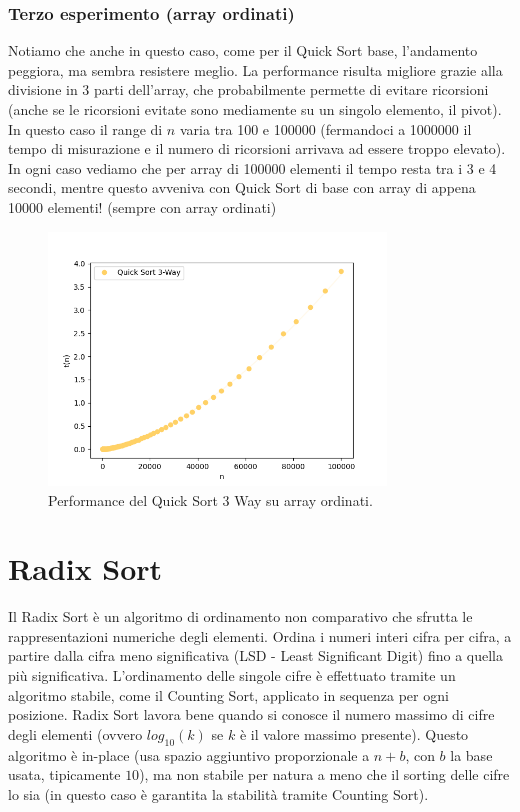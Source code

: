 \documentclass[a4paper, 12pt, oneside]{book}
\begin{document}
\subsection{Terzo esperimento (array ordinati)}

Notiamo che anche in questo caso, come per il Quick Sort base, l'andamento peggiora, ma sembra resistere meglio.
La performance risulta migliore grazie alla divisione in 3 parti dell'array, che probabilmente permette di evitare ricorsioni (anche se le ricorsioni evitate sono mediamente su un singolo elemento, il pivot).
In questo caso il range di \(n\) varia tra 100 e 100000 (fermandoci a 1000000 il tempo di misurazione e il numero di ricorsioni arrivava ad essere troppo elevato). In ogni caso vediamo che per array di 100000 elementi il tempo resta tra i 3 e 4 secondi, mentre questo avveniva con Quick Sort di base con array di appena 10000 elementi! (sempre con array ordinati)

\begin{figure}[H]
    \centering
    \includegraphics[width=0.8\textwidth]{images/quicksort3wayCasoPeggiore.png}
    \caption{Performance del Quick Sort 3 Way su array ordinati.}
    \label{fig:quick_sort_3_way_m}
\end{figure}



\chapter{Radix Sort}\label{chap:Radix Sort} %

Il Radix Sort è un algoritmo di ordinamento non comparativo che sfrutta le rappresentazioni numeriche degli elementi. Ordina i numeri interi cifra per cifra, a partire dalla cifra meno significativa (LSD - Least Significant Digit) fino a quella più significativa. L'ordinamento delle singole cifre è effettuato tramite un algoritmo stabile, come il Counting Sort, applicato in sequenza per ogni posizione.
Radix Sort lavora bene quando si conosce il numero massimo di cifre degli elementi (ovvero \(log_{10}(k)\) se \(k\) è il valore massimo presente).
Questo algoritmo è in-place (usa spazio aggiuntivo proporzionale a \(n + b\), con \(b\) la base usata, tipicamente \(10\)), ma non stabile per natura a meno che il sorting delle cifre lo sia (in questo caso è garantita la stabilità tramite Counting Sort).
\end{document}

